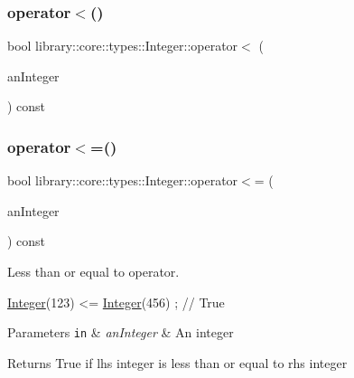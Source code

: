 \subsubsection{\texorpdfstring{operator$<$()}{operator<()}\hspace{0.1cm}{\footnotesize\ttfamily [2/2]}}
{\footnotesize\ttfamily bool library\+::core\+::types\+::\+Integer\+::operator$<$ (\begin{DoxyParamCaption}\item[{const \hyperlink{classlibrary_1_1core_1_1types_1_1_integer_a623afb1580f870fd8a1997b1c12c917d}{Integer\+::\+Value\+Type} \&}]{an\+Integer }\end{DoxyParamCaption}) const}

\mbox{\label{classlibrary_1_1core_1_1types_1_1_integer_a57c084e8ca66e33675a706868b555962}} 
\subsubsection{\texorpdfstring{operator$<$=()}{operator<=()}\hspace{0.1cm}{\footnotesize\ttfamily [1/2]}}
{\footnotesize\ttfamily bool library\+::core\+::types\+::\+Integer\+::operator$<$= (\begin{DoxyParamCaption}\item[{const \hyperlink{classlibrary_1_1core_1_1types_1_1_integer}{Integer} \&}]{an\+Integer }\end{DoxyParamCaption}) const}



Less than or equal to operator. 


\begin{DoxyCode}
\hyperlink{classlibrary_1_1core_1_1types_1_1_integer_a6483b1c4e13e5ed6af5e7a58347efead}{Integer}(123) <= \hyperlink{classlibrary_1_1core_1_1types_1_1_integer_a6483b1c4e13e5ed6af5e7a58347efead}{Integer}(456) ; \textcolor{comment}{// True}
\end{DoxyCode}



\begin{DoxyParams}[1]{Parameters}
\mbox{\tt in}  & {\em an\+Integer} & An integer \\
\hline
\end{DoxyParams}
\begin{DoxyReturn}{Returns}
True if lhs integer is less than or equal to rhs integer 
\end{DoxyReturn}
\mbox{\label{classlibrary_1_1core_1_1types_1_1_integer_a09f6844cd7557f087116a50869765eaa}} 
